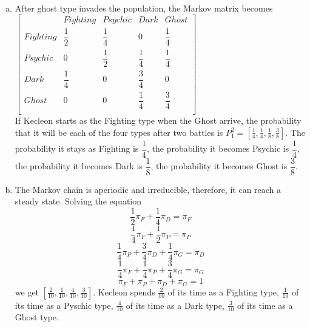 \documentclass[12pt]{article}
\begin{document}
\begin{enumerate}[a)]
  \item
  After ghost type invades the population, the Markov matrix becomes\\ 
   $
  \begin{bmatrix}
    & Fighting & Psychic & Dark & Ghost\\
  Fighting & \dfrac{1}{2} & \dfrac{1}{4} & 0 & \dfrac{1}{4}\\
  Psychic & 0 & \dfrac{1}{2} & \dfrac{1}{4} & \dfrac{1}{4}\\
  Dark & \dfrac{1}{4} & 0 & \dfrac{3}{4} & 0\\
  Ghost & 0 & 0 & \dfrac{1}{4} & \dfrac{3}{4}\\
  \end{bmatrix}
  $\\
  If Kecleon starts as the Fighting type when the Ghost arrive, the probability that it will be each of the four types after two battles is $P_1^2=[\frac{1}{4}, \frac{1}{4},\frac{1}{8},\frac{3}{8}]$. The probability it stays as Fighting is $\dfrac{1}{4}$, the probability it becomes Psychic is $\dfrac{1}{4}$, the probability it becomes Dark is $\dfrac{1}{8}$, the probability it becomes Ghost is $\dfrac{3}{8}$.
    
  \item
  The Markov chain is aperiodic and irreducible, therefore, it can reach a steady state. Solving the equation
  \begin{equation}
  \dfrac{1}{2}\pi_F+\dfrac{1}{4}\pi_D=\pi_F
  \end{equation}  
  \begin{equation}
  \dfrac{1}{4}\pi_F+\dfrac{1}{2}\pi_P=\pi_P
  \end{equation}  
  \begin{equation}
  \dfrac{1}{4}\pi_P+\dfrac{3}{4}\pi_D+\dfrac{1}{4}\pi_G=\pi_D
  \end{equation} 
  \begin{equation}
  \dfrac{1}{4}\pi_F+\dfrac{1}{4}\pi_P+\dfrac{3}{4}\pi_G=\pi_G
  \end{equation}
  \begin{equation}
  \pi_F+\pi_P+\pi_D+\pi_G=1
  \end{equation} 
  we get $[\frac{2}{10},\frac{1}{10},\frac{4}{10},\frac{3}{10}]$. Kecleon spends $\frac{2}{10}$ of its time as a Fighting type, $\frac{1}{10}$ of its time as a Pyschic type, $\frac{4}{10}$ of its time as a Dark type, $\frac{3}{10}$ of its time as a Ghost type.

\end{enumerate}
\end{document}
